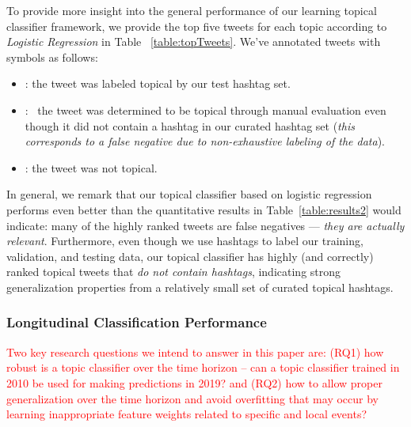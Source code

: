 To provide more insight into the general performance of our learning
topical classifier framework, we provide the top five tweets for
each topic according to \textit{Logistic Regression} in Table
~\ref{table:topTweets}.  We've annotated tweets with symbols as follows:
\begin{itemize}
\item \checkmark: \; the tweet was labeled topical by our test hashtag set.
\item \starmark:\ \; the tweet was determined to be topical through manual evaluation
even though it did not contain a hashtag in our curated hashtag set (\emph{this corresponds
to a false negative due to non-exhaustive labeling of the data}).
\item \xmark: \; the tweet was not topical.
\end{itemize}  
In general, we remark that our topical classifier based on
logistic regression performs even better than the quantitative results
in Table~\ref{table:results2} would indicate: many of the highly
ranked tweets are false negatives --- \emph{they are actually relevant}.
Furthermore, even though we use hashtags to label our
training, validation, and testing data, our topical classifier has
highly (and correctly) ranked topical tweets that \emph{do not contain
hashtags}, indicating strong generalization properties from a
relatively small set of curated topical hashtags.





\subsubsection*{Longitudinal Classification Performance}
\textcolor{red}{Two key research questions we intend to answer in this paper are: (RQ1) how robust is a topic classifier over the time horizon -- can a topic classifier trained in 2010 be used for making predictions in 2019? and (RQ2) how to allow proper generalization over the time horizon and avoid overfitting that may occur by learning inappropriate feature  weights related to specific and local events?}

